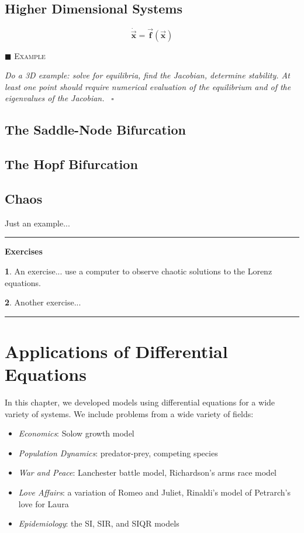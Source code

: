 \documentclass[reqno]{immbook}
\newcommand{\BF}{\vec{\textbf{f}}}
\newcommand{\BX}{\vec{\textbf{x}}}
\numberwithin{equation}{chapter}
\numberwithin{question}{section}
\numberwithin{theorem}{chapter}
\numberwithin{figure}{chapter}
\theoremstyle{definition}
\newtheorem{exercise}{}[section]
\newenvironment{xexample}%
{%

\medskip\noindent\addtocounter{example}{1}$\blacksquare$ \textsc{Example \theexample}\hspace*{1em}%
}%
{%
~\hfill$\square$

\medskip
}
\newenvironment{exercises}%
{%
\medskip\hrule\medskip\noindent\textbf{Exercises}%
}%
{%
\medskip\hrule
}
\begin{document}
\section{Higher Dimensional Systems}
\[
  \dot{\BX} = \BF(\BX)
\]
\begin{xexample}
\emph{Do a 3D example: solve for equilibria, find the
Jacobian, determine stability.  At least one point
should require numerical evaluation of the equilibrium
and of the eigenvalues of the Jacobian.}
\end{xexample}
%

\section{The Saddle-Node Bifurcation}

\section{The Hopf Bifurcation}

\section{Chaos}
Just an example...

\begin{exercises}
\begin{exercise}
An exercise... use a computer to observe chaotic solutions
to the Lorenz equations.
\end{exercise}
\begin{exercise}
Another exercise...
\end{exercise}
\end{exercises}
%
%
%

\chapter{Applications of Differential Equations}
%
In this chapter, we developed models using differential
equations for a wide variety of systems.
We include problems from a wide variety of fields:
\begin{itemize}
\item \emph{Economics}: Solow growth model
\item \emph{Population Dynamics}: predator-prey, competing species
\item \emph{War and Peace}: Lanchester battle model, Richardson's arms
race model
\item \emph{Love Affairs}: a variation of Romeo and Juliet, Rinaldi's
model of Petrarch's love for Laura
\item \emph{Epidemiology}: the SI, SIR, and SIQR models
\end{itemize}
%
\newpage
%
\end{document}
